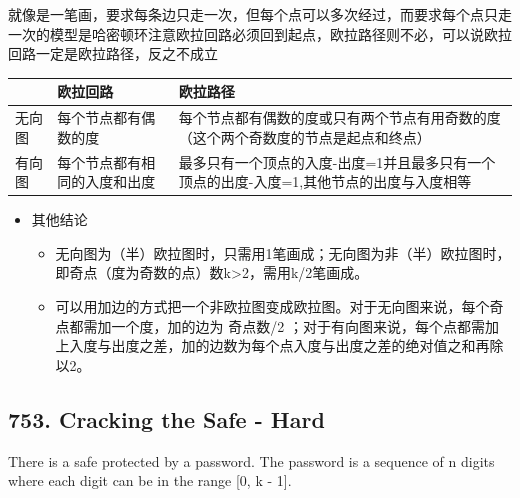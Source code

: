 \documentclass[9pt, b5paaper]{book}
\begin{document}
就像是一笔画，要求每条边只走一次，但每个点可以多次经过，而要求每个点只走一次的模型是哈密顿环注意欧拉回路必须回到起点，欧拉路径则不必，可以说欧拉回路一定是欧拉路径，反之不成立
\begin{center}
\begin{tabular}{lll}
\hline
 & 欧拉回路 & 欧拉路径\\
\hline
无向图 & 每个节点都有偶数的度 & 每个节点都有偶数的度或只有两个节点有用奇数的度（这个两个奇数度的节点是起点和终点）\\
有向图 & 每个节点都有相同的入度和出度 & 最多只有一个顶点的入度-出度=1并且最多只有一个顶点的出度-入度=1,其他节点的出度与入度相等\\
\hline
\end{tabular}
\end{center}
\begin{itemize}
\item 其他结论
\begin{itemize}
\item 无向图为（半）欧拉图时，只需用1笔画成；无向图为非（半）欧拉图时，即奇点（度为奇数的点）数k>2，需用k/2笔画成。
\item 可以用加边的方式把一个非欧拉图变成欧拉图。对于无向图来说，每个奇点都需加一个度，加的边为 奇点数/2 ；对于有向图来说，每个点都需加上入度与出度之差，加的边数为每个点入度与出度之差的绝对值之和再除以2。
\end{itemize}
\end{itemize}

\subsection{753. Cracking the Safe - Hard}
\label{sec-1-5-1}
There is a safe protected by a password. The password is a sequence of n digits where each digit can be in the range [0, k - 1].
\end{document}
